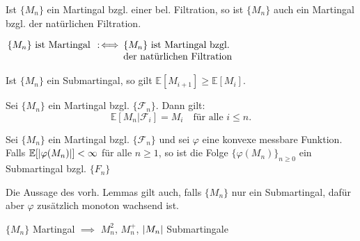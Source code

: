 \documentclass{cheat-sheet}
\newcommand{\E}{\mathbb{E}} %
\newcommand{\Filt}{\mathcal{F}} %
\begin{document}
\begin{lem}
  Ist $\{ M_n \}$ ein Martingal bzgl. einer bel. Filtration, so ist $\{ M_n \}$ auch ein Martingal bzgl. der natürlichen Filtration.
\end{lem}

\begin{defn}
  $
    \arraycolsep=1pt
    \begin{array}[t]{r c l}
      \{ M_n \} \text{ ist Martingal} & \coloniff & \{ M_n \} \text{ ist Martingal bzgl.} \\
      && \text{der natürlichen Filtration}
    \end{array}
  $
\end{defn}

\begin{lem}
  Ist $\{ M_n \}$ ein Submartingal, so gilt $\E[ M_{i+1} ] \geq \E[M_i]$.
\end{lem}

\begin{lem}
  Sei $\{ M_n \}$ ein Martingal bzgl. $\{ \Filt_n \}$.
  Dann gilt:
  \[
    \E[M_n | \Filt_i] = M_i
    \quad \text{für alle $i \leq n$.}
  \]
\end{lem}

\begin{lem}
  Sei $\{ M_n \}$ ein Martingal bzgl. $\{ \Filt_n \}$ und sei $\varphi$ eine konvexe messbare Funktion.
  Falls $\E [\abs{\varphi(M_n)}] < \infty$ für alle $n \geq 1$, so ist die Folge $\{ \varphi(M_n) \}_{n \geq 0}$ ein Submartingal bzgl. $\{ F_n \}$
\end{lem}

\begin{bem}
  Die Aussage des vorh. Lemmas gilt auch, falls $\{ M_n \}$ nur ein Submartingal, dafür aber $\varphi$ zusätzlich monoton wachsend ist.
\end{bem}

\begin{bsp}
  $\{ M_n \}$ Martingal $\implies$ $M_n^2$, $M_n^{+}$, $\lvert M_n\rvert$ Submartingale
\end{bsp}
\end{document}
